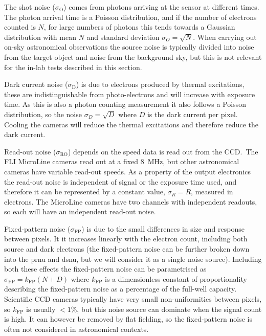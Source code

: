 \begin{colsection}
\begin{colsection}
The shot noise ($\sigma_\text{O}$) comes from photons arriving at the sensor at different times. The photon arrival time is a Poisson distribution, and if the number of electrons counted is $N$, for large numbers of photons this tends towards a Gaussian distribution with mean $N$ and standard deviation $\sigma_O = \sqrt{N}$. When carrying out on-sky astronomical observations the source noise is typically divided into noise from the target object and noise from the background sky, but this is not relevant for the in-lab tests described in this section.

Dark current noise ($\sigma_\text{D}$) is due to electrons produced by thermal excitations, these are indistinguishable from photo-electrons and will increase with exposure time. As this is also a photon counting measurement it also follows a Poisson distribution, so the noise $\sigma_D = \sqrt{D}$ where $D$ is the dark current per pixel. Cooling the cameras will reduce the thermal excitations and therefore reduce the dark current.

Read-out noise ($\sigma_\text{RO}$) depends on the speed data is read out from the CCD.\ The FLI MicroLine cameras read out at a fixed \SI{8}{\mega\hertz}, but other astronomical cameras have variable read-out speeds. As a property of the output electronics the read-out noise is independent of signal or the exposure time used, and therefore it can be represented by a constant value, $\sigma_R = R$, measured in electrons. The MicroLine cameras have two channels with independent readouts, so each will have an independent read-out noise.

Fixed-pattern noise ($\sigma_\text{FP}$) is due to the small differences in size and response between pixels. It it increases linearly with the electron count, including both source and dark electrons (the fixed-pattern noise can be further broken down into the \gls{prnu} and \gls{dsnu}, but we will consider it as a single noise source). Including both these effects the fixed-pattern noise can be parametrised as $\sigma_\text{FP} = k_\text{FP}(N+D)$ where $k_\text{FP}$ is a dimensionless constant of proportionality describing the fixed-pattern noise as a percentage of the full-well capacity. Scientific CCD cameras typically have very small non-uniformities between pixels, so $k_\text{FP}$ is usually $<1\%$, but this noise source can dominate when the signal count is high. It can however be removed by flat fielding, so the fixed-pattern noise is often not considered in astronomical contexts.


\end{colsection}
\end{colsection}
